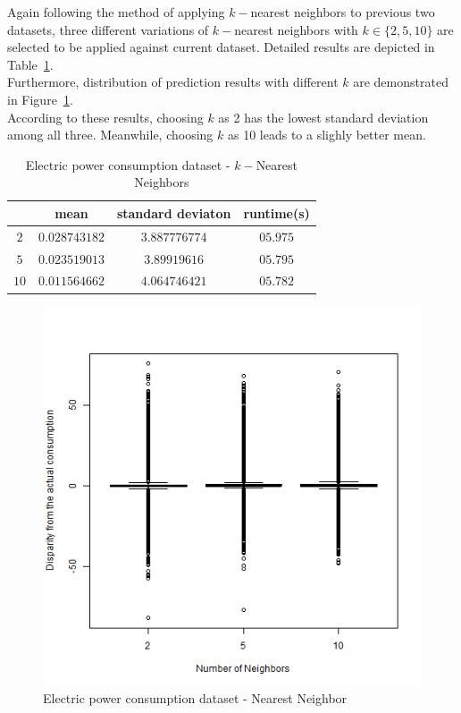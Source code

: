 Again following the method of applying $k-$nearest neighbors to previous two
datasets, three different variations of $k-$nearest neighbors with
$k\in\{2, 5, 10\}$ are selected to be applied against current dataset. Detailed
results are depicted in Table~\ref{ypmsd:table:ds3knnresults}.\\
Furthermore, distribution of prediction results with different $k$ are
demonstrated in Figure~\ref{ypmsd:fig:db3:nnrresults}.\\
According to these results, choosing $k$ as 2 has the lowest standard deviation
among all three. Meanwhile, choosing $k$ as 10 leads to a slighly better mean.

\begin{table}[p]
	\begin{center}
		\begin{tabular}{|c|c|c|c|}
			\hline	\backslashbox{$k$}{}&mean&standard deviaton&runtime(s)\\
\hline$2$&$0.028743182$&$3.887776774$&$05.975$\\
\hline$5$&$0.023519013$&$3.89919616$&$05.795$\\
\hline$10$&$0.011564662$&$4.064746421$&$05.782$\\\hline
\end{tabular}
\end{center}
\caption{Electric power consumption dataset - $k-$Nearest Neighbors}
\label{ypmsd:table:ds3knnresults}
\end{table}

\begin{figure}[p]
	\center
	\includegraphics[scale=\figurescaling]{figures/db3/NNR.png}
	\caption{Electric power consumption dataset - Nearest Neighbor}
	\label{ypmsd:fig:db3:nnrresults}
\end{figure}


